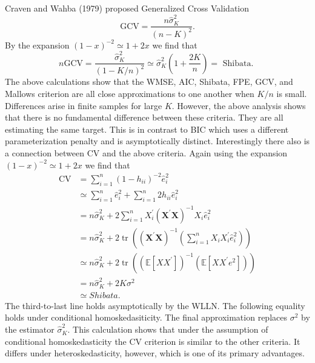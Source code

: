 \documentclass[10pt]{article}
\begin{document}
Craven and Wahba (1979) proposed Generalized Cross Validation
$$
\mathrm{GCV}=\frac{n \widehat{\sigma}_{K}^{2}}{(n-K)^{2}} .
$$
By the expansion $(1-x)^{-2} \simeq 1+2 x$ we find that
$$
n \mathrm{GCV}=\frac{\widehat{\sigma}_{K}^{2}}{(1-K / n)^{2}} \simeq \widehat{\sigma}_{K}^{2}\left(1+\frac{2 K}{n}\right)=\text { Shibata. }
$$
The above calculations show that the WMSE, AIC, Shibata, FPE, GCV, and Mallows criterion are all close approximations to one another when $K / n$ is small. Differences arise in finite samples for large $K$. However, the above analysis shows that there is no fundamental difference between these criteria. They are all estimating the same target. This is in contrast to BIC which uses a different parameterization penalty and is asymptotically distinct. Interestingly there also is a connection between $\mathrm{CV}$ and the above criteria. Again using the expansion $(1-x)^{-2} \simeq 1+2 x$ we find that
$$
\begin{aligned}
\mathrm{CV} &=\sum_{i=1}^{n}\left(1-h_{i i}\right)^{-2} \widehat{e}_{i}^{2} \\
& \simeq \sum_{i=1}^{n} \widehat{e}_{i}^{2}+\sum_{i=1}^{n} 2 h_{i i} \widehat{e}_{i}^{2} \\
&=n \widehat{\sigma}_{K}^{2}+2 \sum_{i=1}^{n} X_{i}^{\prime}\left(\boldsymbol{X}^{\prime} \boldsymbol{X}\right)^{-1} X_{i} \widehat{e}_{i}^{2} \\
&=n \widehat{\sigma}_{K}^{2}+2 \operatorname{tr}\left(\left(\boldsymbol{X}^{\prime} \boldsymbol{X}\right)^{-1}\left(\sum_{i=1}^{n} X_{i} X_{i}^{\prime} \widehat{e}_{i}^{2}\right)\right) \\
& \simeq n \widehat{\sigma}_{K}^{2}+2 \operatorname{tr}\left(\left(\mathbb{E}\left[X X^{\prime}\right]\right)^{-1}\left(\mathbb{E}\left[X X^{\prime} e^{2}\right]\right)\right) \\
&=n \widehat{\sigma}_{K}^{2}+2 K \sigma^{2} \\
& \simeq S h i b a t a .
\end{aligned}
$$
The third-to-last line holds asymptotically by the WLLN. The following equality holds under conditional homoskedasiticity. The final approximation replaces $\sigma^{2}$ by the estimator $\widehat{\sigma}_{K}^{2}$. This calculation shows that under the assumption of conditional homoskedasticity the CV criterion is similar to the other criteria. It differs under heteroskedasticity, however, which is one of its primary advantages.
\end{document}
